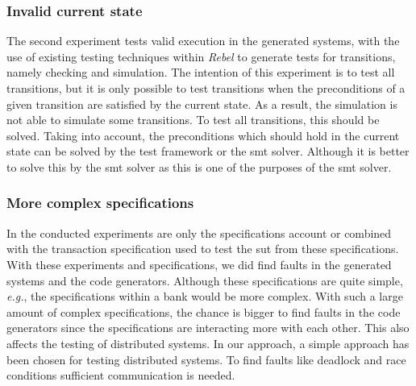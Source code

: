 \subsubsection{Invalid current state}
The second experiment tests valid execution in the generated systems, with the
use of existing testing techniques within \textit{Rebel} to generate tests for
transitions, namely checking and simulation. The intention of this experiment is
to test all transitions, but it is only possible to test transitions when the
preconditions of a given transition are satisfied by the current state.
As a result, the simulation is not able to simulate some transitions.
To test all transitions, this should be solved. Taking into account, the
preconditions which should hold in the current state can be solved by the test
framework or the \gls{smt} solver. Although it is better to solve this by the
\gls{smt} solver as this is one of the purposes of the \gls{smt} solver.

\subsubsection{More complex specifications}
In the conducted experiments are only the specifications account or combined
with the transaction specification used to test the \gls{sut} from these
specifications. With these experiments and specifications, we did find faults in
the generated systems and the code generators. Although these specifications are
quite simple, \textit{e.g.}, the specifications within a bank would be more
complex. With such a large amount of complex specifications, the chance is
bigger to find faults in the code generators since the specifications are
interacting more with each other.
This also affects the testing of distributed systems. In our approach, a
simple approach has been chosen for testing distributed systems. To find faults
like deadlock and race conditions sufficient communication is needed.
